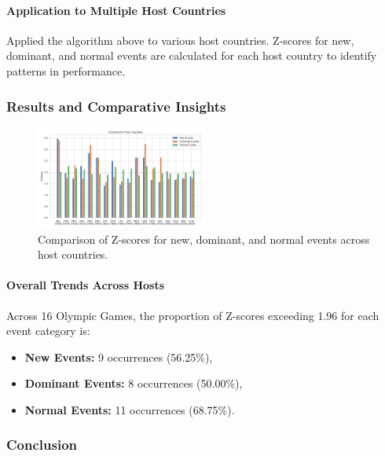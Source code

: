 \documentclass{mcmthesis}
\begin{document}
\paragraph{Application to Multiple Host Countries}

Applied the algorithm above to various host countries. Z-scores for new, dominant, and normal events are calculated for each host country to identify patterns in performance.

\subsubsection{Results and Comparative Insights}


\begin{figure}  %
    \centering
    \includegraphics[width=0.5\textwidth]{pics/host_country_zscores.png}
    \caption{Comparison of Z-scores for new, dominant, and normal events across host countries.}
    \label{fig:zscore_comparison}
\end{figure}


\paragraph{Overall Trends Across Hosts}

Across 16 Olympic Games, the proportion of Z-scores exceeding 1.96 for each event category is:
\begin{itemize}
    \item \textbf{New Events:} 9 occurrences (56.25\%),
    \item \textbf{Dominant Events:} 8 occurrences (50.00\%),
    \item \textbf{Normal Events:} 11 occurrences (68.75\%).
\end{itemize}

\subsubsection{Conclusion}
\end{document}
